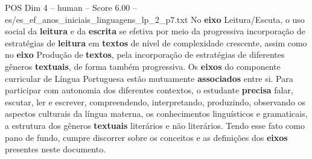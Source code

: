 \begin{textsample}{POS Dim 4 – human – Score 6.00 – es/es\_ef\_anos\_iniciais\_linguagens\_lp\_2\_p7.txt}  \label{ex:f4_pos_005}
No \textbf{eixo} Leitura/Escuta, o uso social da \textbf{leitura} e da \textbf{escrita} se efetiva por meio da progressiva incorporação de estratégias de \textbf{leitura} em \textbf{textos} de nível de complexidade crescente, assim como no \textbf{eixo} Produção de \textbf{textos}, pela incorporação de estratégias de diferentes gêneros \textbf{textuais}, de forma também progressiva.
Os \textbf{eixos} do componente curricular de Língua Portuguesa estão mutuamente \textbf{associados} entre si.
Para participar com autonomia dos diferentes contextos, o estudante \textbf{precisa} falar, escutar, ler e escrever, compreendendo, interpretando, produzindo, observando os aspectos culturais da língua materna, os conhecimentos linguísticos e gramaticais, a estrutura dos gêneros \textbf{textuais} literários e não literários.
Tendo esse fato como pano de fundo, cumpre discorrer sobre os conceitos e as definições dos \textbf{eixos} presentes neste documento.

\end{textsample}
